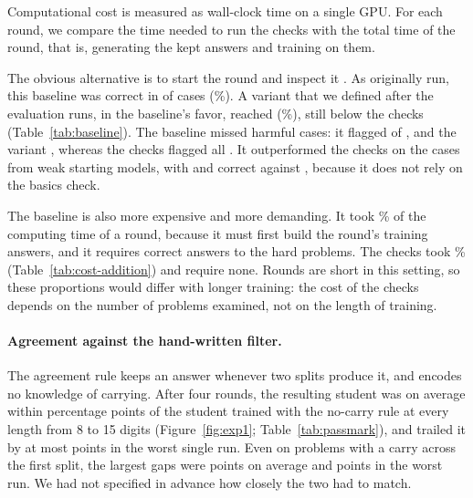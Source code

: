 Computational cost is measured as wall-clock time on a single GPU. For each
round, we compare the time needed to run the checks with the total time of
the round, that is, generating the kept answers and training on them.

The obvious alternative is to start the round and inspect it
. As originally run, this baseline was correct
in \gpBaselineCorrect{} of \gpCases{} cases (\gpBaselineCorrectPct\%). A
variant that we defined after the evaluation runs, in the baseline's favor,
reached \gpVariantCorrect{} (\gpVariantCorrectPct\%), still below the checks
(Table~\ref{tab:baseline}). The baseline missed harmful cases: it flagged
\gpBaselineHarmFlagged{} of \gpHarmful{}, and the variant
\gpVariantHarmFlagged{}, whereas the checks flagged all \gpHarmful{}. It
outperformed the checks on the \gpWeakCases{} cases from weak starting
models, with \gpBaselineWeakCorrect{} and \gpVariantWeakCorrect{} correct
against \gpOursWeakCorrect{}, because it does not rely on the basics check.



The baseline is also more expensive and more demanding. It took
\gpBaselineCostAdditionPct\% of the computing time of a round, because it must first
build the round's training answers, and it requires correct answers to the
hard problems. The checks took \gpChecksCostAdditionPct\%
(Table~\ref{tab:cost-addition}) and require none. Rounds are short in this
setting, so these proportions would differ with longer training: the cost of
the checks depends on the number of problems examined, not on the length of
training.



\paragraph{Agreement against the hand-written filter.}
\label{sec:agreement-vs-filter}

The agreement rule keeps an answer whenever two splits produce it, and
encodes no knowledge of carrying. After four rounds, the resulting student
was on average within \gpGapMean{} percentage points of the student trained
with the no-carry rule at every length from 8 to 15 digits
(Figure~\ref{fig:exp1}; Table~\ref{tab:passmark}), and trailed it by at most \gpGapWorst{} points in
the worst single run. Even on problems with a carry across the first split,
the largest gaps were \gpGapMeanCarry{} points on average and
\gpGapWorstCarry{} points in the worst run. We had not specified in advance
how closely the two had to match.

